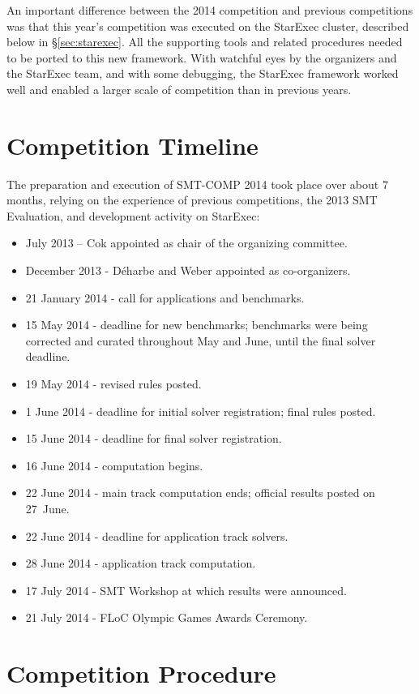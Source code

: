 \documentclass[twoside,11pt]{article}
\begin{document}
An important difference between the 2014 competition and previous competitions was that this year's competition was executed on the StarExec cluster, described below in \S\ref{sec:starexec}. All the supporting tools and related procedures needed to be ported to this new framework. With watchful eyes by the organizers and the StarExec team, and with some debugging, the StarExec framework worked well and enabled a larger scale of competition than in previous years.

\section{Competition Timeline}
\label{sec:timeline}

The preparation and execution of SMT-COMP 2014 took place over about 7 months, relying on the experience of previous competitions, the 2013 SMT Evaluation, and development activity on StarExec:
\begin{itemize}
\item July 2013 -- Cok appointed as chair of the organizing committee.
\item December 2013 - D\'{e}harbe and Weber appointed as co-organizers.
\item 21 January 2014 - call for applications and benchmarks.
\item 15 May 2014 - deadline for new benchmarks; benchmarks were being corrected and curated throughout May and June, until the final solver deadline.
\item 19 May 2014 - revised rules posted.
\item 1 June 2014 - deadline for initial solver registration; final rules posted.
\item 15 June 2014 - deadline for final solver registration.
\item 16 June 2014 - computation begins.
\item 22 June 2014 - main track computation ends; official results posted on 27~June.
\item 22 June 2014 - deadline for application track solvers.
\item 28 June 2014 - application track computation.
\item 17 July 2014 - SMT Workshop at which results were announced.
\item 21 July 2014 - FLoC Olympic Games Awards Ceremony.
\end{itemize}

\section{Competition Procedure} 
\label{sec:procedure}
\end{document}
